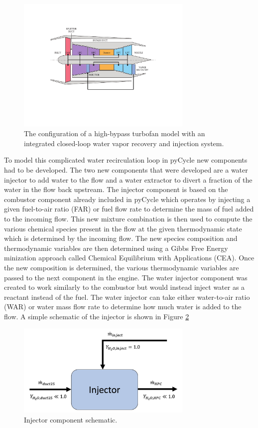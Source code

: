 \documentclass[12pt]{article}
\begin{document}
\begin{figure}[!hbt]
    \centering
    \includegraphics[width=0.75\textwidth]{turbofan_wvr.pdf}
    \caption{The configuration of a high-bypass turbofan model with an integrated closed-loop water vapor recovery and injection system.}
    \label{fig:hbtf_cycle}
\end{figure}

\noindent
To model this complicated water recirculation loop in pyCycle new components had to be developed.
The two new components that were developed are a water injector to add water to the flow and a water extractor to divert a fraction of the water in the flow back upstream.
The injector component is based on the combustor component already included in pyCycle which operates by injecting a given fuel-to-air ratio (FAR) or fuel flow rate to determine the mass of fuel added to the incoming flow.
This new mixture combination is then used to compute the various chemical species present in the flow at the given thermodynamic state which is determined by the incoming flow.
The new species composition and thermodynamic variables are then determined using a Gibbs Free Energy minization approach called Chemical Equilibrium with Applications (CEA).
Once the new composition is determined, the various thermodynamic variables are passed to the next component in the engine.
The water injector component was created to work similarly to the combustor but would instead inject water as a reactant instead of the fuel.
The water injector can take either water-to-air ratio (WAR) or water mass flow rate to determine how much water is added to the flow.
A simple schematic of the injector is shown in Figure \ref{fig:injector}

\begin{figure}[!hbt]
    \centering
    \includegraphics[width=0.75\textwidth]{injector.png}
    \caption{Injector component schematic.}
    \label{fig:injector}
\end{figure}
\end{document}
